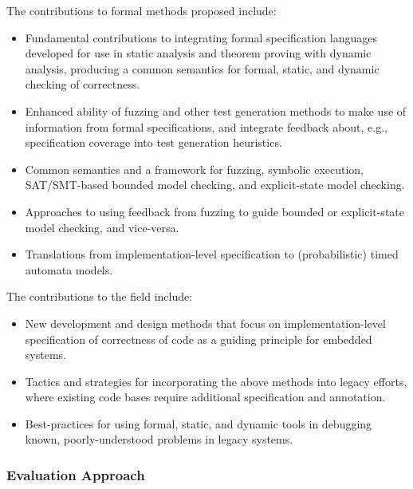 The contributions to formal methods proposed include:

\begin{itemize}
\item Fundamental contributions to integrating formal specification
languages developed for use in static analysis and theorem proving
with dynamic analysis, producing a common semantics for formal,
static, and dynamic checking of correctness.
\item Enhanced ability of fuzzing and other test generation methods to
make use of information from formal specifications, and integrate
feedback about, e.g., specification coverage into test generation
heuristics.
\item Common semantics and a framework for fuzzing, symbolic execution, SAT/SMT-based
bounded model checking, and explicit-state model checking.
\item Approaches to using feedback from fuzzing to guide bounded or explicit-state model
checking, and vice-versa.
\item Translations from implementation-level specification to
(probabilistic) timed automata models.
\end{itemize}

The contributions to the field include:

\begin{itemize}
\item New development and design methods that focus on
implementation-level specification of correctness of code as a guiding
principle for embedded systems.
\item Tactics and strategies for incorporating the above methods into
legacy efforts, where existing code bases require additional
specification and annotation.
\item Best-practices for using formal, static, and dynamic tools in
debugging known, poorly-understood problems in legacy systems.
\end{itemize}

\subsubsection{Evaluation Approach}
\label{sec:eval}
